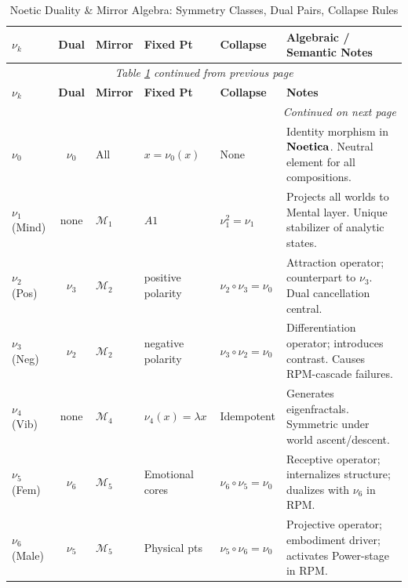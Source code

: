 \renewcommand{\arraystretch}{1.28}
\small
\begin{longtable}{p{1.3cm}|c|p{1.5cm}|p{1.8cm}|p{2cm}|p{4.5cm}}
\caption{Noetic Duality \& Mirror Algebra: Symmetry Classes, Dual Pairs, Collapse Rules}
\label{tab:noetic-duality-algebra} \\
\toprule
\textbf{$\nu_k$}
& \textbf{Dual}
& \textbf{Mirror}
& \textbf{Fixed Pt}
& \textbf{Collapse}
& \textbf{Algebraic / Semantic Notes}
\\
\midrule
\endfirsthead
\multicolumn{6}{c}{\textit{Table \ref{tab:noetic-duality-algebra} continued from previous page}} \\
\toprule
\textbf{$\nu_k$}
& \textbf{Dual}
& \textbf{Mirror}
& \textbf{Fixed Pt}
& \textbf{Collapse}
& \textbf{Notes}
\\
\midrule
\endhead
\midrule
\multicolumn{6}{r}{\textit{Continued on next page}} \\
\endfoot
\bottomrule
\endlastfoot

$\nu_0$
& $\nu_0$
& All
& $x = \nu_0(x)$
& None
& Identity morphism in $\mathbf{Noetica}$. Neutral element for all compositions.
\\
\midrule

$\nu_1$ (Mind)
& none
& $\mathcal{M}_1$
& $A1$
& $\nu_1^2 = \nu_1$
& Projects all worlds to Mental layer. Unique stabilizer of analytic states.
\\
\midrule

$\nu_2$ (Pos)
& $\nu_3$
& $\mathcal{M}_2$
& positive polarity
& $\nu_2 \circ \nu_3 = \nu_0$
& Attraction operator; counterpart to $\nu_3$. Dual cancellation central.
\\
\midrule

$\nu_3$ (Neg)
& $\nu_2$
& $\mathcal{M}_2$
& negative polarity
& $\nu_3 \circ \nu_2 = \nu_0$
& Differentiation operator; introduces contrast. Causes RPM-cascade failures.
\\
\midrule

$\nu_4$ (Vib)
& none
& $\mathcal{M}_4$
& $\nu_4(x) = \lambda x$
& Idempotent
& Generates eigenfractals. Symmetric under world ascent/descent.
\\
\midrule

$\nu_5$ (Fem)
& $\nu_6$
& $\mathcal{M}_5$
& Emotional cores
& $\nu_6 \circ \nu_5 = \nu_0$
& Receptive operator; internalizes structure; dualizes with $\nu_6$ in RPM.
\\
\midrule

$\nu_6$ (Male)
& $\nu_5$
& $\mathcal{M}_5$
& Physical pts
& $\nu_5 \circ \nu_6 = \nu_0$
& Projective operator; embodiment driver; activates Power-stage in RPM.
\\
\midrule


\end{longtable}
